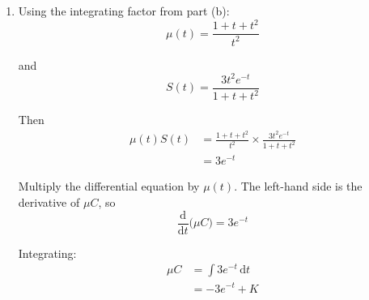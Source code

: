 \documentclass[leqno]{article}
\begin{document}
\begin{enumerate}[
  label=\textbf{\arabic*.},
  leftmargin=*,
  topsep=0pt,
  partopsep=0pt,
  parsep=0pt
]
\begin{djsSolution}
\begin{enumerate}[label=\textbf{(\alph*)}]
\begin{enumerate}[label=(\roman*)]
    Now use the long-term value:
    \begin{align*}
    \lim_{t\to\infty} C
    &= \lim_{t\to\infty}\frac{Kt^2}{1+t+t^2} \\
    &= \lim_{t\to\infty}\frac{K}{t^{-2}+t^{-1}+1} \\
    &= K
    \end{align*}

    Since the long-term concentration is $M$, we must have $K=M$.

    Therefore
    \[
    C=\frac{Mt^2}{1+t+t^2}
    \]

    \item Half the long-term value is $\frac{M}{2}$. Set
    \[
    \frac{Mt^2}{1+t+t^2}=\frac{M}{2}
    \]

    Cancelling $M$ and solving:
    \begin{align*}
    \frac{t^2}{1+t+t^2}&=\frac12 \\
    2t^2&=1+t+t^2 \\
    t^2-t-1&=0
    \end{align*}

    Hence
    \[
    t=\frac{1\pm\sqrt{5}}{2}
    \]

    Since $t>0$:
    \[
    t=\frac{1+\sqrt{5}}{2}\text{ hours}\approx 1.618\text{ hours}
    \]

    Converting to minutes:
    \[
    1.618\times 60 \approx 97.1
    \]

    So the concentration reaches half its long-term value after $97$ minutes, to the nearest minute.
  \end{enumerate}

  \item Using the integrating factor from part (b):
  \[
  \mu(t)=\frac{1+t+t^2}{t^2}
  \]

  and
  \[
  S(t)=\frac{3t^2e^{-t}}{1+t+t^2}
  \]

  Then
  \begin{align*}
  \mu(t)S(t)
  &= \frac{1+t+t^2}{t^2}\times\frac{3t^2e^{-t}}{1+t+t^2} \\
  &= 3e^{-t}
  \end{align*}

  Multiply the differential equation by $\mu(t)$. The left-hand side is the derivative of $\mu C$, so
  \[
  \frac{\mathrm{d}}{\mathrm{d}t}\bigl(\mu C\bigr)=3e^{-t}
  \]

  Integrating:
  \begin{align*}
  \mu C
  &= \int 3e^{-t}\,\mathrm{d}t \\
  &= -3e^{-t}+K
  \end{align*}


\end{enumerate}
\end{djsSolution}
\end{enumerate}
\end{document}

